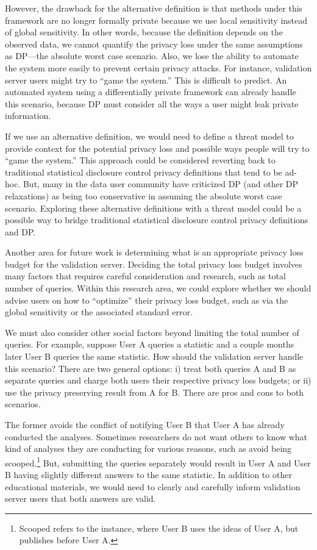 However, the drawback for the alternative definition is that methods under this framework are no longer formally private because we use local sensitivity instead of global sensitivity. In other words, because the definition depends on the observed data, we cannot quantify the privacy loss under the same assumptions as DP---the absolute worst case scenario. Also, we lose the ability to automate the system more easily to prevent certain privacy attacks. For instance, validation server users might try to ``game the system.'' This is difficult to predict. An automated system using a differentially private framework can already handle this scenario, because DP must consider all the ways a user might leak private information.

If we use an alternative definition, we would need to define a threat model to provide context for the potential privacy loss and possible ways people will try to ``game the system.'' This approach could be considered reverting back to traditional statistical disclosure control privacy definitions that tend to be ad-hoc. But, many in the data user community have criticized DP (and other DP relaxations) as being too conservative in assuming the absolute worst case scenario. Exploring these alternative definitions with a threat model could be a possible way to bridge traditional statistical disclosure control privacy definitions and DP.

Another area for future work is determining what is an appropriate privacy loss budget for the validation server. Deciding the total privacy loss budget involves many factors that requires careful consideration and research, such as total number of queries. Within this research area, we could explore whether we should advise users on how to ``optimize'' their privacy loss budget, such as via the global sensitivity or the associated standard error.

We must also consider other social factors beyond limiting the total number of queries. For example, suppose User A queries a statistic and a couple months later User B queries the same statistic. How should the validation server handle this scenario? There are two general options: i) treat both queries A and B as separate queries and charge both users their respective privacy loss budgets; or ii) use the privacy preserving result from A for B. There are pros and cons to both scenarios.

The former avoids the conflict of notifying User B that User A has already conducted the analyses. Sometimes researchers do not want others to know what kind of analyses they are conducting for various reasons, such as avoid being scooped.\footnote{Scooped refers to the instance, where User B uses the ideas of User A, but publishes before User A.} But, submitting the queries separately would result in User A and User B having slightly different answers to the same statistic. In addition to other educational materials, we would need to clearly and carefully inform validation server users that both answers are valid.

